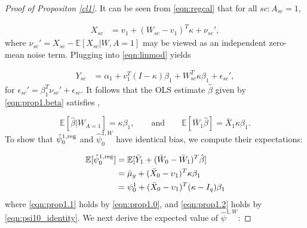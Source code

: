 \begin{proof}[Proof of Propositon \ref{cl1}]
It can be seen from \eqref{eqn:regcal} that for all $sc: A_{sc}=1$,

\begin{align*}
   X_{sc} &= v_1 + (W_{sc} - v_1)^T \kappa + \nu_{sc}',
\end{align*}
where $\nu_{sc}' = X_{sc} - \mathbb{E}[X_{sc}|W,A=1]$ may be viewed as an independent zero-mean noise term. Plugging into \eqref{eqn:linmod} yields 

\begin{align*}
   Y_{sc} & = \alpha_1 + v_1^T (I - \kappa)\beta_1 + W_{sc}^T \kappa \beta_1 + \epsilon_{sc}',
\end{align*}
for $\epsilon_{sc}' = \beta_1^T\nu_{sc}' + \epsilon_{sc}$. It follows that the OLS estimate $\hat{\beta}$ given by \eqref{eqn:prop1.beta} satisfies \citep{gleser1992importance},

\begin{equation}\label{eqn:prop1.0}
\mathbb{E}[\hat{\beta}|W_{A=1}] = \kappa \beta_1, \qquad \text{and} \qquad \mathbb{E}[\bar{W}_1 \hat{\beta}] = \bar{X}_1 \kappa \beta_1.
\end{equation}
To show that $\hat{\psi}_0^{1,\textup{reg}}$ and $\hat{\psi}_0^{1,W}$ have identical bias, we compute their expectations:

\begin{align}
\nonumber	\mathbb{E}[\hat{\psi}_0^{1,\textup{reg}}] &= \mathbb{E}[ \bar{Y}_1 + (\bar{W}_0 - \bar{W}_1)^T \hat{\beta}] \\
	& = \bar{\mu}_y + (\bar{X}_0 - \upsilon_1)^T\kappa\beta_1 \label{eqn:prop1.1}\\
	& = \psi_0^1 + (\bar{X}_0 - \upsilon_1)^T(\kappa - I_q)\beta_1 \label{eqn:prop1.2}
\end{align}
where \eqref{eqn:prop1.1} holds by \eqref{eqn:prop1.0}, and \eqref{eqn:prop1.2} holds by \eqref{eqn:psi10_identity}. We next derive the expected value of $\hat{\psi}^{1, W}$:


\end{proof}
